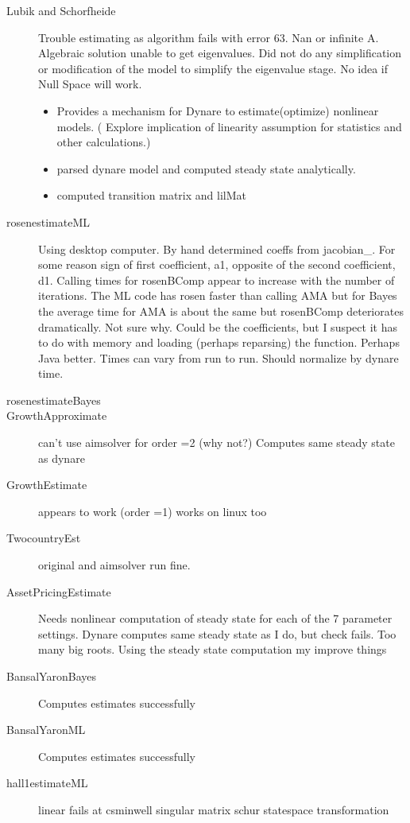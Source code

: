 \documentclass[12pt]{article}
\begin{document}
\begin{description}
\item[Lubik and Schorfheide] Trouble estimating as algorithm fails with error 63. Nan or infinite A.  Algebraic solution unable to get eigenvalues.  Did not do any simplification or modification of the model to simplify the eigenvalue stage. No idea if Null Space will work.

  \begin{itemize}
\item Provides a mechanism for Dynare to estimate(optimize) nonlinear models.
  ( Explore
implication of linearity assumption for statistics and other calculations.)
  \item parsed dynare model and computed steady state analytically.
  \item computed transition matrix and lilMat
  \end{itemize}
\item[rosenestimateML] 
Using desktop computer. By hand determined coeffs from jacobian\_.  For some reason sign of  first coefficient, a1,  opposite of the second coefficient, d1.
Calling times for rosenBComp appear to increase with the number of iterations.
The ML code has rosen faster than calling AMA but for Bayes the average time
for AMA is about the same but rosenBComp deteriorates dramatically.  Not sure why.  Could be the coefficients, but I suspect it has to do with memory and
loading (perhaps reparsing) the function. Perhaps Java better.  Times can vary from run to run.  Should normalize by dynare time. 
\item[rosenestimateBayes]
\item[GrowthApproximate] can't use aimsolver for order =2  (why not?)  Computes same steady state as dynare
\item[GrowthEstimate] appears to work (order =1)  works on linux too
\item[TwocountryEst] original and aimsolver run fine.
\item[AssetPricingEstimate] Needs nonlinear computation of steady state for each of the 7 parameter settings. Dynare computes same steady state as I do, but check fails. Too many big roots. Using the steady state computation my improve things
\item[BansalYaronBayes] Computes estimates successfully
\item[BansalYaronML] Computes estimates successfully
\item[hall1estimateML] linear fails at csminwell  singular matrix schur statespace transformation

\end{description}
\end{document}
